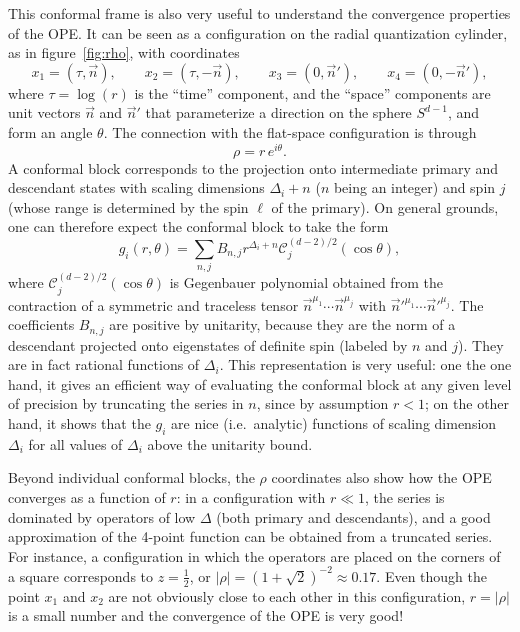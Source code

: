 \documentclass[a4paper,12pt]{article}
\numberwithin{equation}{section}
\begin{document}
This conformal frame is also very useful to understand the convergence properties of the OPE. It can be seen as a configuration on the radial quantization cylinder, as in figure~\ref{fig:rho}, with coordinates
\begin{equation}
	x_1 = (\tau, \vec{n}),
	\qquad
	x_2 = (\tau, -\vec{n}),
	\qquad
	x_3 = (0, \vec{n}'),
	\qquad
	x_4 = (0, -\vec{n}'),
\end{equation}
where $\tau = \log(r)$ is the ``time'' component, and the ``space'' components are unit vectors $\vec{n}$ and $\vec{n}'$ that parameterize a direction on the sphere $S^{d-1}$, and form an angle $\theta$. The connection with the flat-space configuration is through
\begin{equation}
	\rho = r \, e^{i \theta}.
\end{equation}
A conformal block corresponds to the projection onto intermediate primary and descendant states with scaling dimensions $\Delta_i + n$ ($n$ being an integer) and spin $j$ (whose range is determined by the spin $\ell$ of the primary). On general grounds, one can therefore expect the conformal block to take the form
\begin{equation}
	g_i(r, \theta)
	= \sum_{n,j} B_{n,j} r^{\Delta_i + n}
	\mathcal{C}_j^{(d-2)/2}(\cos\theta),
	\label{eq:radialexpansion}
\end{equation}
where $\mathcal{C}_j^{(d-2)/2}(\cos\theta)$ is  Gegenbauer polynomial obtained from the contraction of a symmetric and traceless tensor $\vec{n}^{\mu_1} \cdots \vec{n}^{\mu_j}$ with $\vec{n}'^{\mu_1} \cdots \vec{n}'^{\mu_j}$.
The coefficients $B_{n,j}$ are positive by unitarity, because they are the norm of a descendant projected onto eigenstates of definite spin (labeled by $n$ and $j$). They are in fact rational functions of $\Delta_i$.
This representation is very useful: one the one hand, it gives an efficient way of evaluating the conformal block at any given level of precision by truncating the series in $n$, since by assumption $r < 1$; on the other hand, it shows that the $g_i$ are nice (i.e.~analytic) functions of scaling dimension $\Delta_i$ for all values of $\Delta_i$ above the unitarity bound.

Beyond individual conformal blocks, the $\rho$ coordinates also show how the OPE converges as a function of $r$: in a configuration with $r \ll 1$, the series is dominated by operators of low $\Delta$ (both primary and descendants), and a good approximation of the 4-point function can be obtained from a truncated series.
For instance, a configuration in which the operators are placed on the corners of a square corresponds to $z = \frac{1}{2}$, or $\left| \rho \right| = (1 + \sqrt{2})^{-2} \approx 0.17$. Even though the point $x_1$ and $x_2$ are not obviously close to each other in this configuration, $r = \left| \rho \right|$ is a small number and the convergence of the OPE is very good!
\end{document}
